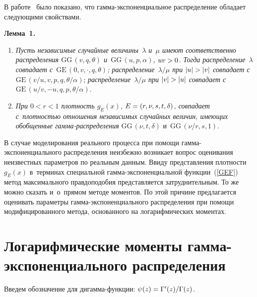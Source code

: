 \begin{multicols}{2}
\smallskip

В работе~\cite{Ku2019_2} было показано, что гам\-ма-экс\-по\-нен\-ци\-аль\-ное распределение 
обладает следующими свойствами.

\smallskip

\noindent
\textbf{Лемма~1.}
\begin{enumerate}[1.]
\item \textit{Пусть независимые случайные величины~$\lambda$ и~$\mu$ имеют соответственно 
распределения $\mathrm{GG}\,(v,q,\theta)$ и~$\mathrm{GG}\,(u,p,\alpha)$, $uv\hm>0$. Тогда
распределение~$\lambda$ совпадает с~$\mathrm{GE}\,(0,v,\cdot,q,\theta)$;
распределение~$\lambda/\mu$ при $|u|\hm>|v|$ совпадает с}
$\mathrm{GE}\,(v/u,v,p,q,\theta/\alpha)$;
\textit{распределение~$\lambda/\mu$ при $|v|\hm>|u|$ совпадает с~$\mathrm{GE}\,(u/v,-
u,q,p,\theta/\alpha)$}.
\item
 \textit{При $0<r<1$ плотность $g_E(x)$, $E\hm=(r,\nu,s,t,\delta)$, совпадает 
с~плот\-ностью отношения независимых случайных величин, имеющих обобщенные 
гам\-ма-рас\-пре\-де\-ле\-ния}
$\mathrm{GG}\,(\nu,t,\delta)$ и~$\mathrm{GG}\,(\nu/r,s,1)$.
\end{enumerate}


В случае моделирования реального процесса при помощи гам\-ма-экс\-по\-нен\-ци\-аль\-но\-го 
распределения неизбежно возникает вопрос оценивания неизвестных параметров по 
реальным данным. Ввиду представления плот\-ности~$g_E(x)$ в~терминах специальной 
гам\-ма-экс\-по\-нен\-ци\-аль\-ной функции~(\ref{GEF}) метод максимального правдоподобия 
представляется затруднительным. То же можно сказать и~о~прямом методе моментов. 
По этой причине предлагается оценивать параметры гам\-ма-экс\-по\-нен\-ци\-аль\-но\-го 
распределения при помощи модифицированного метода, основанного на 
логарифмических моментах.

\section{Логарифмические моменты гамма-экспоненциального распределения}

Введем обозначение для ди\-гам\-ма-функ\-ции: $ \psi(z)\hm={\Gamma'(z)}/{\Gamma(z)}$.


\end{multicols}
